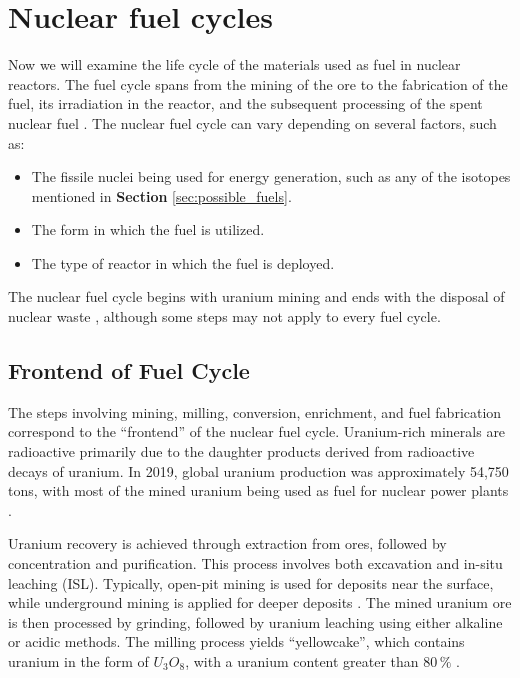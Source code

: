 \chapter{Nuclear fuel cycles}

Now we will examine the life cycle of the materials used as fuel in nuclear reactors. The fuel cycle spans from the mining of the ore to the fabrication of the fuel, its irradiation in the reactor, and the subsequent processing of the spent nuclear fuel \cite{fuel_cycle_book}. The nuclear fuel cycle can vary depending on several factors, such as:

\begin{itemize}
    \item The fissile nuclei being used for energy generation, such as any of the isotopes mentioned in \textbf{Section} \ref{sec:possible_fuels}.
    \item The form in which the fuel is utilized.
    \item The type of reactor in which the fuel is deployed.
\end{itemize}

The nuclear fuel cycle begins with uranium mining and ends with the disposal of nuclear waste \cite{fuel_cycle_book}, although some steps may not apply to every fuel cycle.

\section{Frontend of Fuel Cycle}

The steps involving mining, milling, conversion, enrichment, and fuel fabrication correspond to the ``frontend'' of the nuclear fuel cycle. Uranium-rich minerals are radioactive primarily due to the daughter products derived from radioactive decays of uranium. In 2019, global uranium production was approximately 54,750 tons, with most of the mined uranium being used as fuel for nuclear power plants \cite{fuel_cycle_book}.

Uranium recovery is achieved through extraction from ores, followed by concentration and purification. This process involves both excavation and in-situ leaching (ISL). Typically, open-pit mining is used for deposits near the surface, while underground mining is applied for deeper deposits \cite{fuel_cycle_book}. The mined uranium ore is then processed by grinding, followed by uranium leaching using either alkaline or acidic methods. The milling process yields ``yellowcake'', which contains uranium in the form of \(U_3O_8\), with a uranium content greater than \(80 \, \%\) \cite{fuel_cycle_book}.

